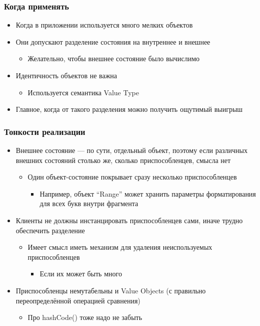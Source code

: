 \documentclass[xetex,mathserif,serif]{beamer}
\begin{document}
    \begin{frame}
        \frametitle{Когда применять}
        \begin{itemize}
            \item Когда в приложении используется много мелких объектов
            \item Они допускают разделение состояния на внутреннее и внешнее
            \begin{itemize}
                \item Желательно, чтобы внешнее состояние было вычислимо
            \end{itemize}
            \item Идентичность объектов не важна
            \begin{itemize}
                \item Используется семантика Value Type
            \end{itemize}
            \item Главное, когда от такого разделения можно получить ощутимый выигрыш
        \end{itemize}
    \end{frame}

    \begin{frame}
        \frametitle{Тонкости реализации}
        \begin{itemize}
            \item Внешнее состояние --- по сути, отдельный объект, поэтому если различных внешних состояний столько же, сколько приспособленцев, смысла нет
            \begin{itemize}
                \item Один объект-состояние покрывает сразу несколько приспособленцев
                \begin{itemize}
                    \item Например, объект ``Range'' может хранить параметры форматирования для всех букв внутри фрагмента
                \end{itemize}
            \end{itemize}
            \item Клиенты не должны инстанцировать приспособленцев сами, иначе трудно обеспечить разделение
            \begin{itemize}
                \item Имеет смысл иметь механизм для удаления неиспользуемых приспособленцев
                \begin{itemize}
                    \item Если их может быть много
                \end{itemize}
            \end{itemize}
            \item Приспособленцы немутабельны и Value Objects (с правильно переопределённой операцией сравнения)
            \begin{itemize}
                \item Про hashCode() тоже надо не забыть
            \end{itemize}
        \end{itemize}
    \end{frame}
\end{document}
